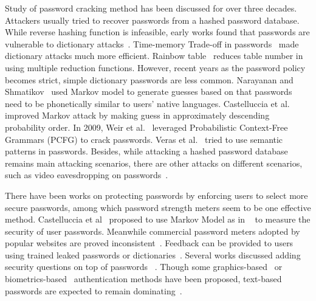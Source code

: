 Study of password cracking method has been discussed for over three
decades. Attackers usually tried to recover passwords from a hashed
password database. While reverse hashing function is infeasible, early
works found that passwords are vulnerable to dictionary
attacks~\cite{morris1979password}. Time-memory Trade-off in
passwords~\cite{hellman1980cryptanalytic} made dictionary attacks much
more efficient. Rainbow table~\cite{oechslin2003making} reduces table
number in~\cite{hellman1980cryptanalytic} using multiple reduction functions. However, recent years as
the password policy becomes strict, simple dictionary passwords are less
common. Narayanan and Shmatikov~\cite{narayanan2005fast} used
Markov model to generate guesses based on that passwords need to be
phonetically similar to users' native languages. Castelluccia et
al.~\cite{castelluccia2013privacy} improved Markov attack by making
guess in approximately descending probability order. In 2009, Weir
et al.~\cite{weir2009password} leveraged Probabilistic Context-Free
Grammars (PCFG) to crack passwords. Veras et
al.~\cite{veras2014semantic} tried to use semantic patterns in
passwords. Besides, while attacking a hashed password database remains
main attacking scenarios, there are other attacks on different
scenarios, such as video eavesdropping on
passwords~\cite{balzarotti2008clearshot}.

There have been works on protecting passwords by enforcing users to
select more secure passwords, among which password strength meters
seem to be one effective method. Castelluccia et
al~\cite{castelluccia2012adaptive} proposed to use Markov Model as in
~\cite{narayanan2005fast} to measure the security of user
passwords. Meanwhile commercial password meters adopted by popular
websites are proved inconsistent~\cite{de2014very}.  Feedback can be
provided to users using trained leaked passwords or
dictionaries~\cite{weir2010testing, komanduri2014telepathwords}.
Several works discussed adding security questions on top of passwords
~\cite{pinkas2002securing, schechter2009s, brainard2006fourth}. Though
some graphics-based~\cite{davis2004user,jermyn1999design} or
biometrics-based~\cite{jain2006biometrics} authentication methods have
been proposed, text-based passwords are expected to remain
dominating~\cite{bonneau2012quest}.
